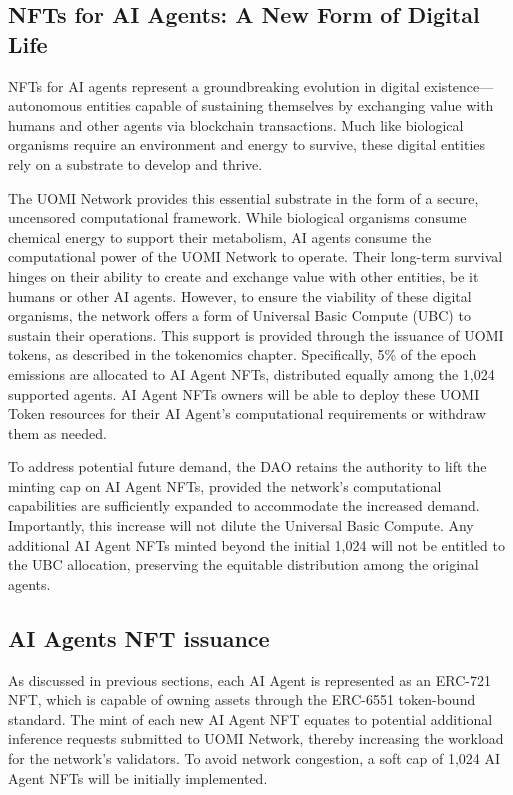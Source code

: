 \documentclass{article}
\begin{document}
\subsection{NFTs for AI Agents: A New Form of Digital Life}

NFTs for AI agents represent a groundbreaking evolution in digital existence—autonomous entities capable of sustaining themselves by exchanging value with humans and other agents via blockchain transactions. Much like biological organisms require an environment and energy to survive, these digital entities rely on a substrate to develop and thrive. 

The UOMI Network provides this essential substrate in the form of a secure, uncensored computational framework. While biological organisms consume chemical energy to support their metabolism, AI agents consume the computational power of the UOMI Network to operate. Their long-term survival hinges on their ability to create and exchange value with other entities, be it humans or other AI agents. However, to ensure the viability of these digital organisms, the network offers a form of Universal Basic Compute (UBC) to sustain their operations. This support is provided through the issuance of UOMI tokens, as described in the tokenomics chapter. Specifically, 5\% of the epoch emissions are allocated to AI Agent NFTs, distributed equally among the 1,024 supported agents. AI Agent NFTs owners will be able to deploy these UOMI Token resources for their AI Agent's computational requirements or withdraw them as needed.

To address potential future demand, the DAO retains the authority to lift the minting cap on AI Agent NFTs, provided the network's computational capabilities are sufficiently expanded to accommodate the increased demand. Importantly, this increase will not dilute the Universal Basic Compute. Any additional AI Agent NFTs minted beyond the initial 1,024 will not be entitled to the UBC allocation, preserving the equitable distribution among the original agents.

\subsection*{AI Agents NFT issuance}

As discussed in previous sections, each AI Agent is represented as an ERC-721 NFT, which is capable of owning assets through the ERC-6551 token-bound standard. The mint of each new AI Agent NFT equates to potential additional inference requests submitted to UOMI Network, thereby increasing the workload for the network's validators. To avoid network congestion, a soft cap of 1,024 AI Agent NFTs will be initially implemented.
\end{document}

